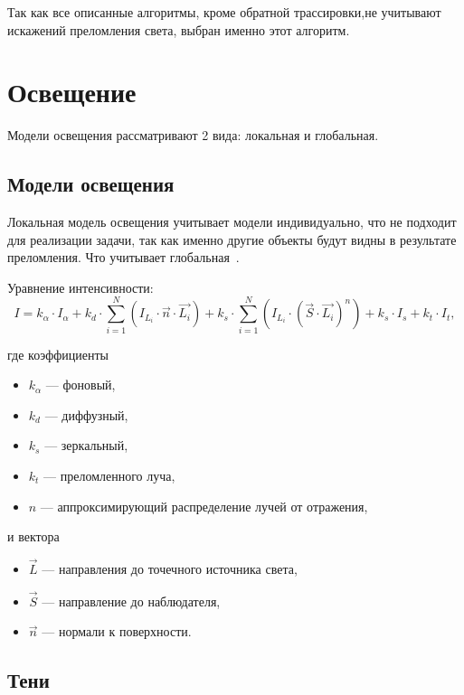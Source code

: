 Так как все описанные алгоритмы, кроме обратной трассировки,не учитывают искажений преломления света, выбран именно этот алгоритм.

\section{Освещение}

Модели освещения рассматривают 2 вида: локальная и глобальная.

\subsection{Модели освещения}

Локальная модель освещения учитывает модели индивидуально, что не подходит для реализации задачи, так как именно другие объекты будут видны в результате преломления. Что учитывает глобальная~\cite[с.~464,~с.~502,~с.~548]{rogers-book}.

Уравнение интенсивности:
\begin{equation}
	I = k_{\alpha} \cdot I_{\alpha} + k_d \cdot \sum_{i=1}^{N} (I_{L_i} \cdot \vec{n} \cdot \vec{L_i}) + k_s \cdot \sum_{i=1}^{N} (I_{L_i} \cdot (\vec{S} \cdot \vec{L_i}) ^ n) + k_s \cdot I_s + k_t \cdot I_t,
\end{equation}

где коэффициенты
\begin{itemize}
	\item $k_{\alpha}$ --- фоновый,
	\item $k_d$ --- диффузный,
	\item $k_s$ --- зеркальный,
	\item $k_t$ --- преломленного луча,
	\item $n$ --- аппроксимирующий распределение лучей от отражения,
\end{itemize}

и вектора
\begin{itemize}
	\item $\vec{L}$ --- направления до точечного источника света,
	\item $\vec{S}$ --- направление до наблюдателя,
	\item $\vec{n}$ --- нормали к поверхности.
\end{itemize}

\subsection{Тени}

